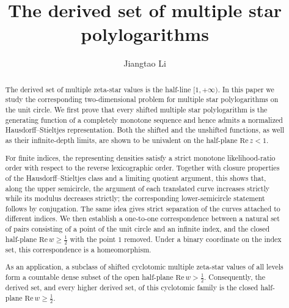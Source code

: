 \documentclass[12pt,a4paper]{amsart}
\numberwithin{equation}{section}
\theoremstyle{plain}
\theoremstyle{definition}
\begin{document}
\title{The derived set of multiple star polylogarithms}

\author{Jiangtao Li}

\address{Jiangtao Li \\ School of Mathematics and Statistics, HNP-LAMA, Central South University, Hunan Province, China}

\begin{abstract}
The derived set of multiple zeta-star values is the half-line $[1,+\infty)$.  In this paper we study the corresponding two-dimensional problem for multiple star polylogarithms on the unit circle.  We first prove that every shifted multiple star polylogarithm is the generating function of a completely monotone sequence and hence admits a normalized Hausdorff--Stieltjes representation.  Both the shifted and the unshifted functions, as well as their infinite-depth limits, are shown to be univalent on the half-plane $\mathrm{Re}\,z<1$.

For finite indices, the representing densities satisfy a strict monotone likelihood-ratio order with respect to the reverse lexicographic order.  Together with closure properties of the Hausdorff--Stieltjes class and a limiting quotient argument, this shows that, along the upper semicircle, the argument of each translated curve increases strictly while its modulus decreases strictly; the corresponding lower-semicircle statement follows by conjugation.  The same idea gives strict separation of the curves attached to different indices.  We then establish a one-to-one correspondence between a natural set of pairs consisting of a point of the unit circle and an infinite index, and the closed half-plane $\mathrm{Re}\,w\geq \frac12$ with the point $1$ removed.  Under a binary coordinate on the index set, this correspondence is a homeomorphism.

As an application, a subclass of shifted cyclotomic multiple zeta-star values of all levels form a countable dense subset of the open half-plane $\mathrm{Re}\,w>\frac12$.  Consequently, the derived set, and every higher derived set, of this cyclotomic family is the closed half-plane $\mathrm{Re}\,w\geq\frac12$.
\end{abstract}

\let\thefootnote\relax{}
\end{document}
